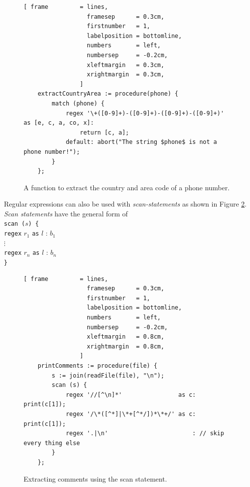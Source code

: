 \documentclass[11pt]{report}
\begin{document}
\begin{figure}[!ht]
\centering
\begin{Verbatim}[ frame         = lines, 
                  framesep      = 0.3cm, 
                  firstnumber   = 1,
                  labelposition = bottomline,
                  numbers       = left,
                  numbersep     = -0.2cm,
                  xleftmargin   = 0.3cm,
                  xrightmargin  = 0.3cm,
                ]
    extractCountryArea := procedure(phone) {
        match (phone) {
            regex '\+([0-9]+)-([0-9]+)-([0-9]+)-([0-9]+)' as [e, c, a, co, x]:
                return [c, a];
            default: abort("The string $phone$ is not a phone number!");
        }
    };
\end{Verbatim}
\vspace*{-0.3cm}
\caption{A function to extract the country and area code of a phone number.}
\label{fig:extract-phone-code.stlx}
\end{figure}
\pagebreak
Regular expressions can also be used with \textsl{scan-statements} as shown in Figure \ref{fig:find-comments-scan.stlx}. \textsl{Scan statements} have the general form of
\\[0.2cm]
\hspace*{1.3cm} \texttt{scan ($s$) \{}  \\
\hspace*{1.8cm} \texttt{regex} $r_1$ \texttt{as} $l$ : $b_1$ \\
\hspace*{1.8cm} $\vdots$                                                  \\
\hspace*{1.8cm} \texttt{regex} $r_n$ \texttt{as} $l$ : $b_n$ \\
\hspace*{1.3cm} \texttt{\}}             
\\[0.2cm]

\begin{figure}[!ht]
\centering
\begin{Verbatim}[ frame         = lines, 
                  framesep      = 0.3cm, 
                  firstnumber   = 1,
                  labelposition = bottomline,
                  numbers       = left,
                  numbersep     = -0.2cm,
                  xleftmargin   = 0.8cm,
                  xrightmargin  = 0.8cm,
                ]
    printComments := procedure(file) {
        s := join(readFile(file), "\n");
        scan (s) {
            regex '//[^\n]*'                as c: print(c[1]);
            regex '/\*([^*]|\*+[^*/])*\*+/' as c: print(c[1]);
            regex '.|\n'                        : // skip every thing else
        }
    };
\end{Verbatim}
\vspace*{-0.3cm}
\caption{Extracting comments using the scan statement.}
\label{fig:find-comments-scan.stlx}
\end{figure}
\end{document}
